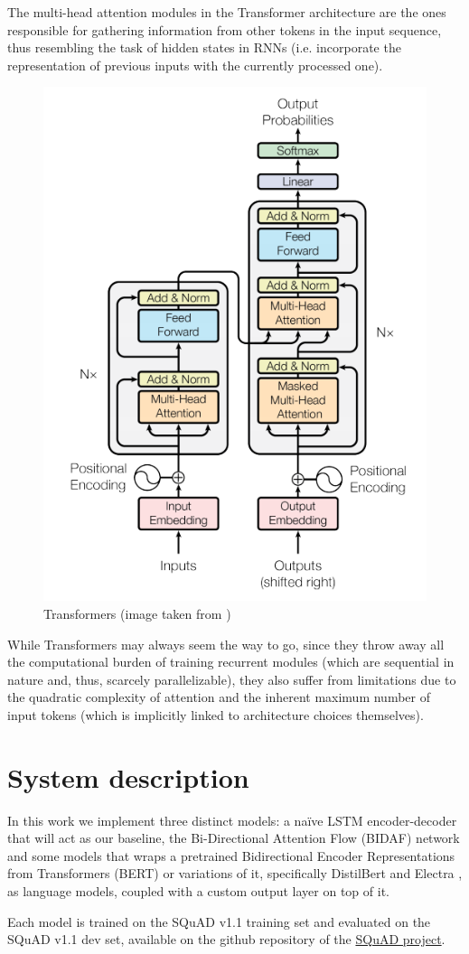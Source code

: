 \documentclass[a4paper,10pt]{report}
\begin{document}
The multi-head attention modules in the Transformer architecture are the ones responsible for gathering information from other tokens in the input sequence, thus resembling the task of hidden states in RNNs (i.e. incorporate the representation of previous inputs with the currently processed one).

\begin{figure}[h]
  \center
  \includegraphics[width=0.45\linewidth]{transformers}
  \caption{Transformers (image taken from \cite{transformers})}
  \label{fig:transformers}
\end{figure}

While Transformers may always seem the way to go, since they throw away all the computational burden of training recurrent modules (which are sequential in nature and, thus, scarcely parallelizable), they also suffer from limitations due to the quadratic complexity of attention and the inherent maximum number of input tokens (which is implicitly linked to architecture choices themselves).


\chapter{System description}\label{chap:system-description}

In this work we implement three distinct models: a naïve LSTM encoder-decoder that will act as our baseline, the Bi-Directional Attention Flow (BIDAF) network \cite{bidaf} and some models that wraps a pretrained Bidirectional Encoder Representations from Transformers (BERT) \cite{bert} or variations of it, specifically DistilBert \cite{distilbert} and Electra \cite{electra}, as language models, coupled with a custom output layer on top of it.

Each model is trained on the SQuAD v1.1 training set and evaluated on the SQuAD v1.1 dev set, available on the github repository of the \href{https://github.com/rajpurkar/SQuAD-explorer/tree/master/}{SQuAD project}.
\end{document}
